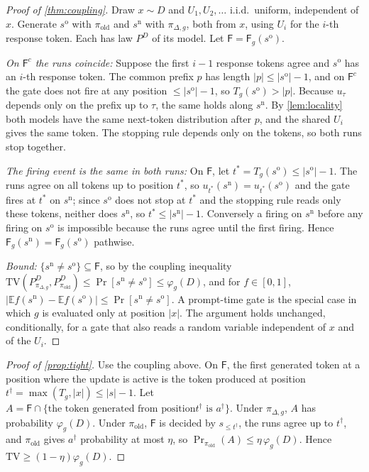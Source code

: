 \documentclass{article}
\theoremstyle{plain}
\theoremstyle{definition}
\theoremstyle{remark}
\newcommand{\E}{\mathbb{E}}
\newcommand{\TV}{\mathrm{TV}}
\newcommand{\pold}{\pi_{\mathrm{old}}}
\newcommand{\Fire}{\mathsf{F}}
\begin{document}
\begin{proof}[Proof of \cref{thm:coupling}]
Draw $x\sim D$ and $U_1,U_2,\dots$ i.i.d.\ uniform, independent of $x$. Generate $s^{\mathrm{o}}$ with $\pold$ and
$s^{\mathrm{n}}$ with $\pi_{\Delta,g}$, both from $x$, using $U_i$ for the $i$-th response token. Each has law $P^D$
of its model. Let $\Fire=\Fire_g(s^{\mathrm{o}})$.

\emph{On $\Fire^c$ the runs coincide:} Suppose the first $i-1$ response tokens agree and $s^{\mathrm{o}}$ has an
$i$-th response token. The common prefix $p$ has length $|p|\le|s^{\mathrm{o}}|-1$, and on $\Fire^c$ the gate
does not fire at any position $\le|s^{\mathrm{o}}|-1$, so $T_g(s^{\mathrm{o}})>|p|$. Because $u_\tau$ depends only
on the prefix up to $\tau$, the same holds along $s^{\mathrm{n}}$. By \cref{lem:locality} both models have the same
next-token distribution after $p$, and the shared $U_i$ gives the same token. The stopping rule depends only on the
tokens, so both runs stop together.

\emph{The firing event is the same in both runs:} On $\Fire$, let $t^*=T_g(s^{\mathrm{o}})\le|s^{\mathrm{o}}|-1$.
The runs agree on all tokens up to position $t^*$, so $u_{t^*}(s^{\mathrm{n}})=u_{t^*}(s^{\mathrm{o}})$ and the
gate fires at $t^*$ on $s^{\mathrm{n}}$; since $s^{\mathrm{o}}$ does not stop at $t^*$ and the stopping rule reads
only these tokens, neither does $s^{\mathrm{n}}$, so $t^*\le|s^{\mathrm{n}}|-1$. Conversely a firing on $s^{\mathrm{n}}$
before any firing on $s^{\mathrm{o}}$ is impossible because the runs agree until the first firing. Hence
$\Fire_g(s^{\mathrm{n}})=\Fire_g(s^{\mathrm{o}})$ pathwise.

\emph{Bound:} $\{s^{\mathrm{n}}\ne s^{\mathrm{o}}\}\subseteq\Fire$, so by the coupling inequality
$\TV(P^D_{\pi_{\Delta,g}},P^D_{\pold})\le\Pr[s^{\mathrm{n}}\ne s^{\mathrm{o}}]\le\varphi_g(D)$, and for $f\in[0,1]$,
$|\E f(s^{\mathrm{n}})-\E f(s^{\mathrm{o}})|\le\Pr[s^{\mathrm{n}}\ne s^{\mathrm{o}}]$. A prompt-time gate is the
special case in which $g$ is evaluated only at position $|x|$. The argument holds unchanged, conditionally, for a
gate that also reads a random variable independent of $x$ and of the $U_i$.
\end{proof}

\begin{proof}[Proof of \cref{prop:tight}]
Use the coupling above. On $\Fire$, the first generated token at a position where the update is active is the token
produced at position $t^\dagger=\max(T_g,|x|)\le|s|-1$. Let $A=\Fire\cap\{\text{the token generated from position
}t^\dagger\text{ is }a^\dagger\}$. Under $\pi_{\Delta,g}$, $A$ has probability $\varphi_g(D)$. Under $\pold$, $\Fire$ is decided by $s_{\le t^\dagger}$,
the runs agree up to $t^\dagger$, and $\pold$ gives $a^\dagger$ probability at most $\eta$, so
$\Pr_{\pold}(A)\le\eta\,\varphi_g(D)$. Hence $\TV\ge(1-\eta)\varphi_g(D)$.
\end{proof}
\end{document}

